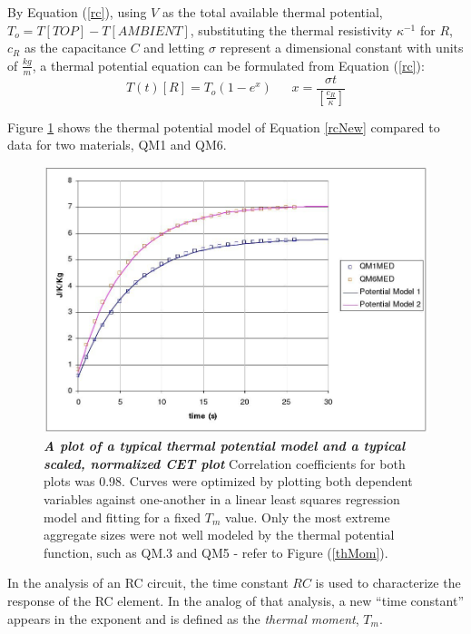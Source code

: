 By Equation (\ref{rc}), using $V$ as the total available thermal potential, $T_{o}=T[TOP]-T[AMBIENT]$, substituting the thermal resistivity $\kappa^{-1}$ for $R$, $c_{R}$ as the capacitance $C$ and letting $\sigma$ represent a dimensional constant with units of $\frac{kg}{m}$, a thermal potential equation can be formulated from Equation (\ref{rc}):
\begin{equation}\label{rcNew}
T(t)[R]=T_{o}(1-e^{x})\:\:\:\:\:\:\:x=\frac{\sigma t}{\left[\frac{c_{R}}{\kappa}\right]}
\end{equation}

Figure \ref{rcthyplot} shows the thermal potential model of Equation \ref{rcNew} compared to data for two materials, QM1 and QM6. 

\begin{figure}[h!]

\begin{center}
\includegraphics[scale=.4]{rcTheory.jpg}
\caption[Thermal Potential Data Comparison]{\textbf{\emph{A plot of a typical thermal potential model and a typical scaled, normalized CET plot}} Correlation coefficients for both plots was 0.98. Curves were optimized by plotting both dependent variables against one-another in a linear least squares regression model and fitting for a fixed $T_{m}$ value. Only the most extreme aggregate sizes were not well modeled by the thermal potential function, such as QM.3 and QM5 - refer to Figure (\ref{thMom}).\label{rcthyplot}}
\end{center}
\end{figure}

In the analysis of an RC circuit, the time constant $RC$ is used to characterize the response of the RC element. In the analog of that analysis, a new ``time constant'' appears in the exponent and is defined as the \emph{thermal moment}, $T_m$. 

